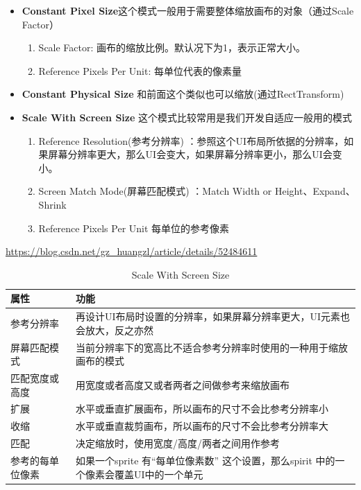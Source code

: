 \documentclass[UTF8,a4paper,12pt]{ctexbook}
\begin{document}
			\begin{itemize}
				\item \textbf{Constant Pixel Size}这个模式一般用于需要整体缩放画布的对象（通过Scale Factor）
					\begin{enumerate}
						\item Scale Factor: 画布的缩放比例。默认况下为1，表示正常大小。
						\item Reference Pixels Per Unit: 每单位代表的像素量
					\end{enumerate}
				\item \textbf{Constant Physical Size} 和前面这个类似也可以缩放(通过RectTransform)
					
				\item \textbf{Scale With Screen Size} 这个模式比较常用是我们开发自适应一般用的模式
					\begin{enumerate}
						\item Reference Resolution(参考分辨率) ：参照这个UI布局所依据的分辨率，如果屏幕分辨率更大，那么UI会变大，如果屏幕分辨率更小，那么UI会变小。
						\item Screen Match Mode(屏幕匹配模式) ：Match Width or Height、Expand、Shrink
						\item Reference Pixels Per Unit 每单位的参考像素
					\end{enumerate}
			\end{itemize}

			\url{https://blog.csdn.net/gz_huangzl/article/details/52484611}
			
			
			\begin{table}[H]
				\centering
				\caption{Scale With Screen Size}
				\begin{tabular}{p{4.5cm}<{\centering}|p{11.5cm}<{\centering}}
					\hline
						属性 &  功能\\
					\hline
						参考分辨率 &  再设计UI布局时设置的分辨率，如果屏幕分辨率更大，UI元素也会放大，反之亦然   \\
						屏幕匹配模式 &   当前分辨率下的宽高比不适合参考分辨率时使用的一种用于缩放画布的模式 \\
						匹配宽度或高度 &  用宽度或者高度又或者两者之间做参考来缩放画布 \\
						扩展 & 水平或垂直扩展画布，所以画布的尺寸不会比参考分辨率小\\
						收缩 & 水平或垂直裁剪画布，所以画布的尺寸不会比参考分辨率大\\
						匹配 & 决定缩放时，使用宽度/高度/两者之间用作参考\\
						参考的每单位像素 & 如果一个sprite 有“每单位像素数” 这个设置，那么spirit 中的一个像素会覆盖UI中的一个单元\\						 
					\hline
				\end{tabular}
			\end{table}
\end{document}
